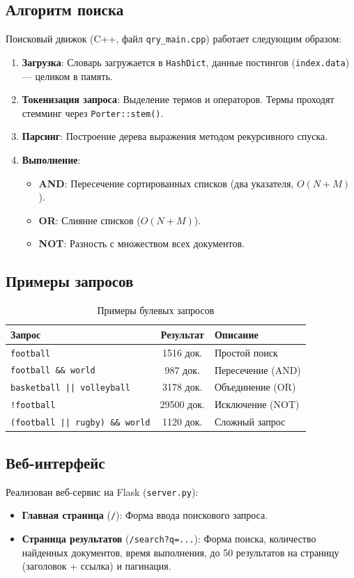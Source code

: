 \documentclass[a4paper,12pt]{article}
\begin{document}
\subsection{Алгоритм поиска}
Поисковый движок (C++, файл \texttt{qry\_main.cpp}) работает следующим образом:
\begin{enumerate}
    \item \textbf{Загрузка}: Словарь загружается в \texttt{HashDict}, данные постингов (\texttt{index.data}) — целиком в память.
    \item \textbf{Токенизация запроса}: Выделение термов и операторов. Термы проходят стемминг через \texttt{Porter::stem()}.
    \item \textbf{Парсинг}: Построение дерева выражения методом рекурсивного спуска.
    \item \textbf{Выполнение}:
    \begin{itemize}
        \item \textbf{AND}: Пересечение сортированных списков (два указателя, $O(N+M)$).
        \item \textbf{OR}: Слияние списков ($O(N+M)$).
        \item \textbf{NOT}: Разность с множеством всех документов.
    \end{itemize}
\end{enumerate}

\subsection{Примеры запросов}
\begin{table}[H]
\centering
\begin{tabular}{|l|c|l|}
\hline
\textbf{Запрос} & \textbf{Результат} & \textbf{Описание} \\
\hline
\texttt{football} & 1516 док. & Простой поиск \\
\hline
\texttt{football \&\& world} & 987 док. & Пересечение (AND) \\
\hline
\texttt{basketball || volleyball} & 3178 док. & Объединение (OR) \\
\hline
\texttt{!football} & 29500 док. & Исключение (NOT) \\
\hline
\texttt{(football || rugby) \&\& world} & 1120 док. & Сложный запрос \\
\hline
\end{tabular}
\caption{Примеры булевых запросов}
\end{table}

\subsection{Веб-интерфейс}
Реализован веб-сервис на Flask (\texttt{server.py}):
\begin{itemize}
    \item \textbf{Главная страница} (\texttt{/}): Форма ввода поискового запроса.
    \item \textbf{Страница результатов} (\texttt{/search?q=...}): Форма поиска, количество найденных документов, время выполнения, до 50 результатов на страницу (заголовок + ссылка) и пагинация.
\end{itemize}
\end{document}

